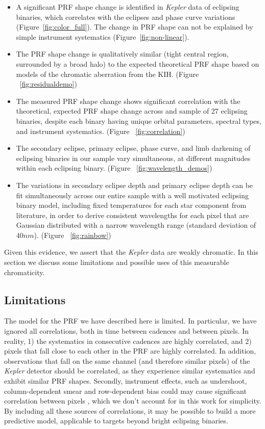 \documentclass[iop]{emulateapj}
\newcommand{\kepler}{\emph{Kepler}\xspace}
\begin{document}
\begin{itemize}
	\item{A significant PRF shape change is identified in \kepler data of eclipsing binaries, which correlates with the eclipses and phase curve variations (Figure~\ref{fig:color_full}). The change in PRF shape can not be explained by simple instrument systematics (Figure~\ref{fig:non-linear}).}
	\item{The PRF shape change is qualitatively similar (tight central region, surrounded by a broad halo)} to the expected theoretical PRF shape based on models of the chromatic aberration from the KIH. (Figure ~\ref{fig:residualdemo})
	\item{The measured PRF shape change shows significant correlation with the theoretical, expected PRF shape change across and sample of 27 eclipsing binaries, despite each binary having unique orbital parameters, spectral types, and instrument systematics. (Figure ~\ref{fig:correlation})}
	\item{The secondary eclipse, primary eclipse, phase curve, and limb darkening of eclipsing binaries in our sample vary simultaneous, at different magnitudes within each eclipsing binary. (Figure ~\ref{fig:wavelength_demos})}
	\item{The variations in secondary eclipse depth and primary eclipse depth can be fit simultaneously across our entire sample with a well motivated eclipsing binary model, including fixed temperatures for each star component from literature, in order to derive consistent wavelengths for each pixel that are Gaussian distributed with a narrow wavelength range (standard deviation of 40$nm$). (Figure ~\ref{fig:rainbow})}
\end{itemize}


Given this evidence, we assert that the \kepler data are weakly chromatic. In this section we discuss some limitations and possible uses of this measurable chromaticity.

\subsection{Limitations}
\label{sec:limitations}

The model for the PRF we have described here is limited. In particular, we have ignored all correlations, both in time between cadences and between pixels. In reality, 1) the systematics in consecutive cadences are highly correlated, and 2) pixels that fall close to each other in the PRF are highly correlated. In addition, observations that fall on the same channel (and therefore similar pixels) of the \kepler detector should be correlated, as they experience similar systematics and exhibit similar PRF shapes. Secondly, instrument effects, such as undershoot, column-dependent smear and row-dependent bias could may cause significant correlation between pixels \citep[see][]{kih}, which we don't account for in this work for simplicity. By including all these sources of correlations, it may be possible to build a more predictive model, applicable to targets beyond bright eclipsing binaries. 
\end{document}

